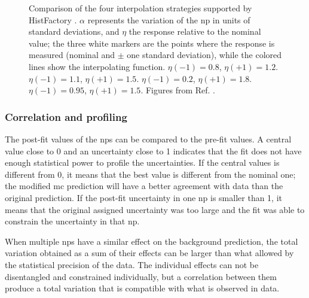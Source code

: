 \begin{figure}[hbt]
\caption{Comparison of the four interpolation strategies supported by HistFactory \cite{Cranmer:1456844}. 
$\alpha$ represents the variation of the \gls{np} in units of standard deviations, and $\eta$ the response relative to the nominal value; 
the three white markers are the points where the response is measured (nominal and $\pm$ one standard deviation), 
while the colored lines show the interpolating function.
 $\eta(-1) = 0.8$, $\eta(+1) = 1.2$.
 $\eta(-1) = 1.1$, $\eta(+1) = 1.5$.
 $\eta(-1) = 0.2$, $\eta(+1) = 1.8$.
 $\eta(-1) = 0.95$, $\eta(+1) = 1.5$.
Figures from Ref. \cite{Cranmer:1456844}.
}
\label{fig:stat:interp}
\end{figure}


\subsubsection*{Correlation and profiling}

The post-fit values of the \glspl{np} can be compared to the pre-fit values. A central value close to 0 and an uncertainty close to 1 indicates that the fit does not have enough statistical power to profile the uncertainties. If the central values is different from 0, it means that the best value is different from the nominal one; the modified \gls{mc} prediction will have a better agreement with data than the original prediction. If the post-fit uncertainty in one \gls{np} is smaller than 1, it means that the original assigned uncertainty was too large and the fit was able to constrain the uncertainty in that \gls{np}.

When multiple \glspl{np} have a similar effect on the background prediction, the total variation obtained as a sum of their effects can be larger than what allowed by the statistical precision of the data. The individual effects can not be disentangled and constrained individually, but a correlation between them produce a total variation that is compatible with what is observed in data. %


